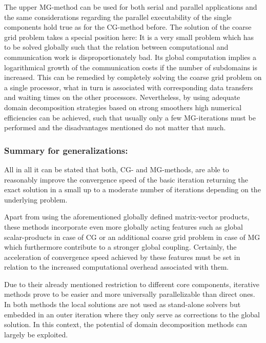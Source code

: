 \newpage
The upper MG-method can be used for both serial and parallel applications and the same considerations regarding the parallel executability of the single components hold true as for the CG-method before.
%
The solution of the coarse grid problem takes a special position here: It is a very small problem which has to be solved globally such that the relation between computational and communication work is disproportionately bad.
Its global computation implies a logarithmical growth of the communication costs if the number of subdomains is increased. This can be remedied by completely solving the coarse grid problem on a single processor, what in turn is associated with corresponding data transfers and waiting times on the other processors. Nevertheless, by using adequate domain decomposition strategies based on strong smoothers high numerical efficiencies can be achieved, such that usually only a few MG-iterations must be performed and the disadvantages mentioned do not matter that much.


\subsubsection{Summary for generalizations:}  
All in all it can be stated that both, CG- and MG-methods, are able to reasonably improve the convergence speed of the basic iteration returning the exact solution in a small up to a moderate number of iterations depending on the underlying problem. 

Apart from using the aforementioned globally defined matrix-vector products, these methods incorporate even more globally acting features such as global scalar-products in case of CG or an additional coarse grid problem in case of MG which furthermore contribute to a stronger global coupling. Certainly, the acceleration of convergence speed achieved by these features must be set in relation to the increased computational overhead associated with them.

Due to their already mentioned restriction to different core components, iterative methods prove to be easier and more universally parallelizable than direct ones. In both methods the local solutions are not used as stand-alone solvers but embedded in an outer iteration where they only serve as corrections to the global solution. In this context, the potential of domain decomposition methods can largely be exploited.



